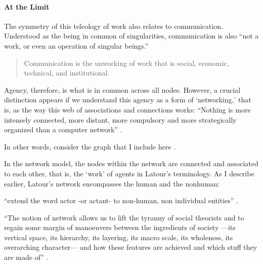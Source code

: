 


\paragraph{At the Limit}

The symmetry of this teleology of work also relates to communication. Understood as the being in common of singularities, communication is also ``not a work, or even an operation of singular beings.'' 
\begin{quote}
	Communication is the unworking of work that is social, economic, technical, and institutional. \parencite[31]{Nan91:The} 
\end{quote} %












Agency, therefore, is what is in common across all nodes. However, a crucial distinction appears if we understand this agency as a form of `networking,' that is, as the way this web of associations and connections works: ``Nothing is more intensely connected, more distant, more compulsory and more strategically organized than a computer network'' \parencite[2]{Lat90:On}.

In other words, consider the graph that I include here . 

In the network model, the nodes within the network are connected and associated to each other, that is, the `work' of agents in Latour's terminology. As I describe earlier, Latour's network encompasses the human and the nonhuman: 

``extend the word actor -or actant- to non-human, non individual entities'' \parencite[2]{Lat90:On}.



 ``The notion of network allows us to lift the tyranny of social theorists and to regain some margin of manoeuvers between the ingredients of society ---its vertical space, its hierarchy, its layering, its macro scale, its wholeness, its overarching character--- and how these features are achieved and which stuff they are made of'' \parencite[5]{Lat90:On}.




